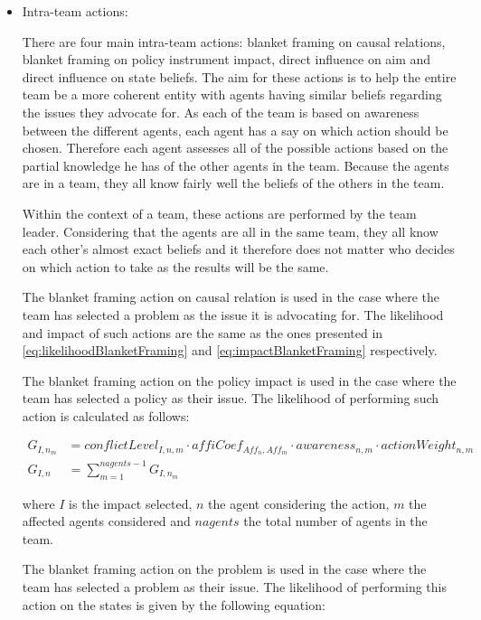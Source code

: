 \begin{itemize}

\item Intra-team actions:

There are four main intra-team actions: blanket framing on causal relations, blanket framing on policy instrument impact, direct influence on aim and direct influence on state beliefs. The aim for these actions is to help the entire team be a more coherent entity with agents having similar beliefs regarding the issues they advocate for. As each of the team is based on awareness between the different agents, each agent has a say on which action should be chosen. Therefore each agent assesses all of the possible actions based on the partial knowledge he has of the other agents in the team. Because the agents are in a team, they all know fairly well the beliefs of the others in the team.

Within the context of a team, these actions are performed by the team leader. Considering that the agents are all in the same team, they all know each other's almost exact beliefs and it therefore does not matter who decides on which action to take as the results will be the same.

The blanket framing action on causal relation is used in the case where the team has selected a problem as the issue it is advocating for. The likelihood and impact of such actions are the same as the ones presented in \autoref{eq:likelihoodBlanketFraming} and \autoref{eq:impactBlanketFraming} respectively.

The blanket framing action on the policy impact is used in the case where the team has selected a policy as their issue. The likelihood of performing such action is calculated as follows:

\begin{equation}\label{eq:likelihoodBlanketFraming}\begin{split}
G_{I, n_m} &= conflictLevel_{I, n, m} \cdot affiCoef_{Aff_n,Aff_m} \cdot awareness_{n,m} \cdot actionWeight_{n,m}\\
G_{I, n} &= \sum_{m = 1}^{nagents-1} G_{I, n_m}
\end{split}\end{equation}

where $I$ is the impact selected, $n$ the agent considering the action, $m$ the affected agents considered and $nagents$ the total number of agents in the team.

The blanket framing action on the problem is used in the case where the team has selected a problem as their issue. The likelihood of performing this action on the states is given by the following equation:


\end{itemize}
